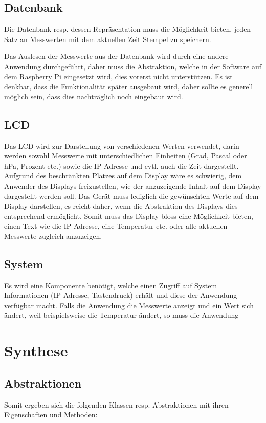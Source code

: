 \documentclass[
    10pt,
    a4paper,
]{scrartcl}
\begin{document}
\subsection{Datenbank}
Die Datenbank resp. dessen Repräsentation muss die Möglichkeit bieten, jeden Satz an
Messwerten mit dem aktuellen Zeit Stempel zu speichern.

Das Auslesen der Messwerte aus der Datenbank wird durch eine andere Anwendung
durchgeführt, daher muss die Abstraktion, welche in der Software auf dem Raspberry Pi
eingesetzt wird, dies vorerst nicht unterstützen. Es ist denkbar, dass die Funktionalität
später ausgebaut wird, daher sollte es generell möglich sein, dass dies nachträglich noch
eingebaut wird.

\subsection{LCD}
Das LCD wird zur Darstellung von verschiedenen Werten verwendet, darin werden sowohl
Messwerte mit unterschiedlichen Einheiten (Grad, Pascal oder hPa, Prozent etc.) sowie die
IP Adresse und evtl. auch die Zeit dargestellt. Aufgrund des beschränkten Platzes auf dem
Display wäre es schwierig, dem Anwender des Displays freizustellen, wie der anzuzeigende
Inhalt auf dem Display dargestellt werden soll. Das Gerät muss lediglich die gewünschten
Werte auf dem Display darstellen, es reicht daher, wenn die Abstraktion des Displays dies
entsprechend ermöglicht. Somit muss das Display bloss eine Möglichkeit bieten, einen Text
wie die IP Adresse, eine Temperatur etc. oder alle aktuellen Messwerte zugleich
anzuzeigen.

\subsection{System}
Es wird eine Komponente benötigt, welche einen Zugriff auf System Informationen (IP
Adresse, Tastendruck) erhält und diese der Anwendung verfügbar macht. Falls die Anwendung
die Messwerte anzeigt und ein Wert sich ändert, weil beispielsweise die Temperatur ändert,
so muss die Anwendung

\section{Synthese}

\subsection{Abstraktionen}
Somit ergeben sich die folgenden Klassen resp. Abstraktionen mit ihren Eigenschaften und
Methoden:
\end{document}
